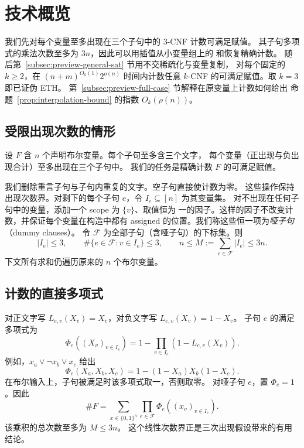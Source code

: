 \section{技术概览}\label{sec:technical-overview}
我们先对每个变量至多出现在三个子句中的 $3$-CNF 计数可满足赋值。
其子句多项式的乘法次数至多为 $3n$，因此可以用插值从小变量组上的
和恢复精确计数。
随后第~\ref{subsec:preview-general-sat} 节用不交稀疏化与变量复制，
对每个固定的 $k\ge2$，在 $(n+m)^{O_k(1)}2^{o(n)}$ 时间内计数任意
$k$-CNF 的可满足赋值。取 $k=3$ 即已证伪 ETH。
第~\ref{subsec:preview-full-case} 节解释在原变量上计数如何给出
命题~\ref{prop:interpolation-bound} 的指数 $O_k(\rho(n))$。

\subsection{受限出现次数的情形}\label{subsec:preview-setting}
设 $F$ 含 $n$ 个声明布尔变量。每个子句至多含三个文字，
每个变量（正出现与负出现合计）至多出现在三个子句中。
我们的任务是精确计数 $F$ 的可满足赋值。

我们删除重言子句与子句内重复的文字。空子句直接使计数为零。
这些操作保持出现次数界。对剩下的每个子句 $e$，令
$I_e\subseteq[n]$ 为其变量集。
对不出现在任何子句中的变量，添加一个 scope 为 $\{v\}$、取值恒为
一的因子。这样的因子不改变计数，并保证每个变量在构造中都有
 assigned 的位置。我们称这些恒一项为\emph{哑子句}（dummy clauses）。
令 $\mathcal F$ 为全部子句（含哑子句）的下标集。则
\begin{equation}\label{eq:overview-incidences}
 |I_e|\le3,\qquad
 \#\{e\in\mathcal F:v\in I_e\}\le3,\qquad
 n\le M:=\sum_{e\in\mathcal F}|I_e|\le3n.
\end{equation}
下文所有求和仍遍历原来的 $n$ 个布尔变量。

\subsection{计数的直接多项式}\label{subsec:preview-encoding}
对正文字写 $L_{e,v}(X_v)=X_v$，对负文字写 $L_{e,v}(X_v)=1-X_v$。
子句 $e$ 的满足多项式为
\[
 \Phi_e((X_v)_{v\in I_e})
 =1-\prod_{v\in I_e}(1-L_{e,v}(X_v)).
\]
例如，$x_a\vee\neg x_b\vee x_c$ 给出
\[
 \Phi_e(X_a,X_b,X_c)=1-(1-X_a)X_b(1-X_c).
\]
在布尔输入上，子句被满足时该多项式取一，否则取零。
对哑子句 $e$，置 $\Phi_e=1$。因此
\begin{equation}\label{eq:overview-direct-count}
 \#F=\sum_{x\in\{0,1\}^n}\prod_{e\in\mathcal F}
                   \Phi_e((x_v)_{v\in I_e}).
\end{equation}
该乘积的总次数至多为 $M\le3n$。
这个线性次数界正是三次出现假设带来的有用结论。

